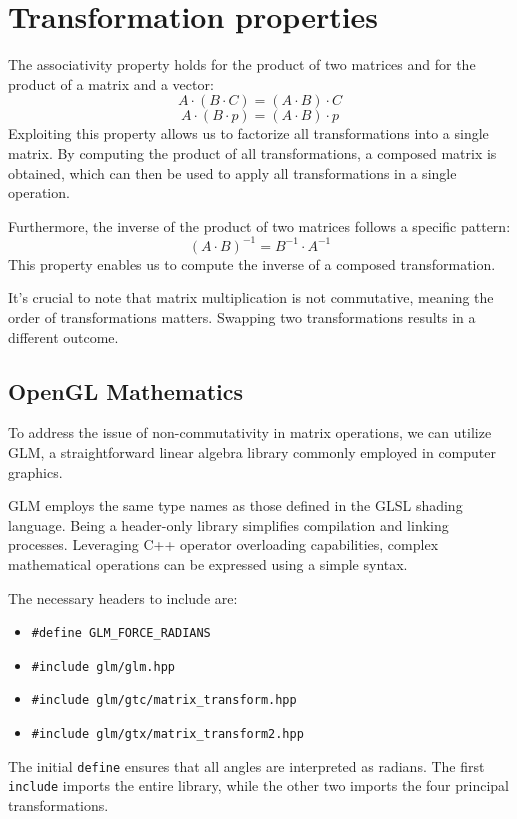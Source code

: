 \section{Transformation properties}

The associativity property holds for the product of two matrices and for the product of a matrix and a vector:
\[A \cdot \left(B \cdot C\right)=\left(A \cdot B\right) \cdot C\]
\[A \cdot \left(B \cdot p\right)=\left(A \cdot B\right) \cdot p\]
Exploiting this property allows us to factorize all transformations into a single matrix. 
By computing the product of all transformations, a composed matrix is obtained, which can then be used to apply all transformations in a single operation.

Furthermore, the inverse of the product of two matrices follows a specific pattern:
\[\left( A \cdot B \right)^{-1}=B^{-1}\cdot A^{-1}\]
This property enables us to compute the inverse of a composed transformation. 

It's crucial to note that matrix multiplication is not commutative, meaning the order of transformations matters. 
Swapping two transformations results in a different outcome.

\subsection{OpenGL Mathematics}
To address the issue of non-commutativity in matrix operations, we can utilize GLM, a straightforward linear algebra library commonly employed in computer graphics.

GLM employs the same type names as those defined in the GLSL shading language. 
Being a header-only library simplifies compilation and linking processes. 
Leveraging C++ operator overloading capabilities, complex mathematical operations can be expressed using a simple syntax.

The necessary headers to include are:
\begin{itemize}
    \item \texttt{\#define GLM\_FORCE\_RADIANS}
    \item \texttt{\#include glm/glm.hpp}
    \item \texttt{\#include glm/gtc/matrix\_transform.hpp}
    \item \texttt{\#include glm/gtx/matrix\_transform2.hpp}
\end{itemize}
The initial \texttt{define} ensures that all angles are interpreted as radians. 
The first \texttt{include} imports the entire library, while the other two imports the four principal transformations.

